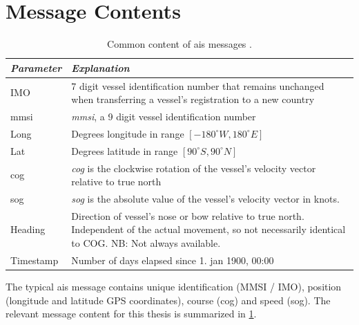 \section{Message Contents}
\begin{table}[h]
    \centering
    \begin{tabular}{p{}  p{}}
        \textit{\textbf{Parameter}} & \textit{\textbf{Explanation}}                                                                                                     \\ \hline
        IMO                         & 7 digit vessel identification number that remains unchanged when transferring a vessel's registration to a new country            \\
        \acrshort{mmsi}                        & \textit{\acrfull{mmsi}}, a 9 digit vessel identification number                                                          \\
        Long                        & Degrees longitude in range $[-180^\circ W, 180^\circ E]$                                                                          \\
        Lat                         & Degrees latitude in range $[90^\circ S, 90^\circ N]$                                                                             \\
        \acrshort{cog}                         & \textit{\acrfull{cog}} is the clockwise rotation of the vessel's velocity vector relative to true north                               \\
        \acrshort{sog}                         & \textit{\acrfull{sog}} is the absolute value of the vessel's velocity vector in knots.                                               \\
        Heading                     & Direction of vessel's nose or bow relative to true north. Independent of the actual movement, so not necessarily identical to COG. NB: Not always available. \\
        Timestamp                   & Number of days elapsed since 1. jan 1900, 00:00                                                                                   \\ \hline
    \end{tabular}
    \caption{Common content of \acrshort{ais} messages \cite{hexeberg}.}
    \label{table:ais_content}
\end{table}
The typical \acrshort{ais} message contains unique identification (MMSI / IMO), position (longitude and latitude GPS coordinates), course (\acrshort{cog}) and speed (\acrshort{sog}). The relevant message content for this thesis is summarized in \cref{table:ais_content}.

